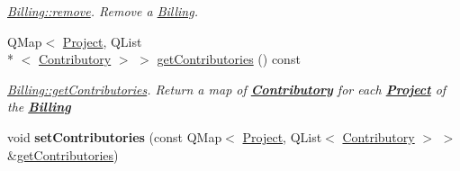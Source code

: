 \begin{DoxyCompactItemize}
\begin{DoxyCompactList}\small\item\em \hyperlink{classBilling_ab5efe0286d292707073b9f1cecd98d6f}{Billing\+::remove}. Remove a \hyperlink{classBilling}{Billing}. \end{DoxyCompactList}\item 
Q\+Map$<$ \hyperlink{classProject}{Project}, Q\+List\\*
$<$ \hyperlink{classContributory}{Contributory} $>$ $>$ \hyperlink{classBilling_a08416c71eee43ec294e666ce45d43856}{get\+Contributories} () const 
\begin{DoxyCompactList}\small\item\em \hyperlink{classBilling_a08416c71eee43ec294e666ce45d43856}{Billing\+::get\+Contributories}. Return a map of {\bfseries \hyperlink{classContributory}{Contributory}} for each {\bfseries \hyperlink{classProject}{Project}} of the {\bfseries \hyperlink{classBilling}{Billing}} \end{DoxyCompactList}\item 
\hypertarget{classBilling_a25706aa084df2f345aaa1323130f78b4}{void {\bfseries set\+Contributories} (const Q\+Map$<$ \hyperlink{classProject}{Project}, Q\+List$<$ \hyperlink{classContributory}{Contributory} $>$ $>$ \&\hyperlink{classBilling_a08416c71eee43ec294e666ce45d43856}{get\+Contributories})}\label{classBilling_a25706aa084df2f345aaa1323130f78b4}


\end{DoxyCompactItemize}
